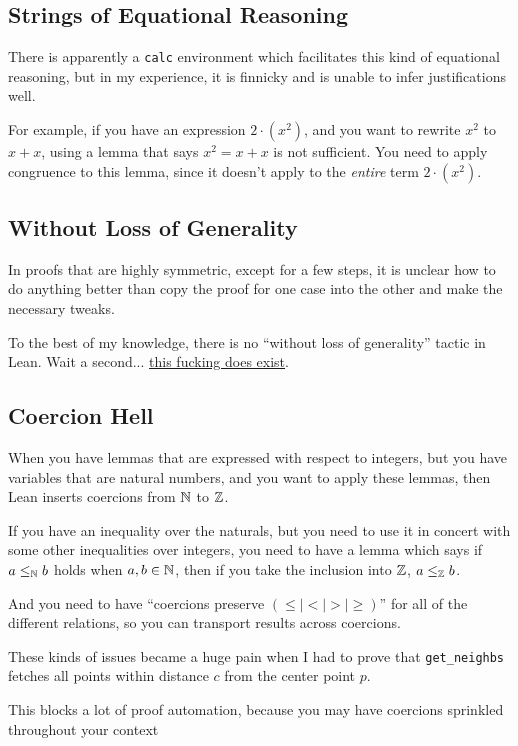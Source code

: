 \documentclass{article}
\begin{document}
\subsection{Strings of Equational Reasoning}
There is apparently a \texttt{calc} environment which facilitates this kind of equational reasoning, but in my experience, it is finnicky and is unable to infer justifications well.

For example, if you have an expression $2 \cdot (x^2)$, and you want to rewrite $x^2$ to $x + x$, using a lemma that says $x^2 = x + x$ is not sufficient.
You need to apply congruence to this lemma, since it doesn't apply to the \textit{entire} term $2 \cdot (x^2)$.

\subsection{Without Loss of Generality}
In proofs that are highly symmetric, except for a few steps, it is unclear how to do anything better than copy the proof for one case into the other and make the necessary tweaks.

To the best of my knowledge, there is no ``without loss of generality'' tactic in Lean.
Wait a second... \href{https://leanprover-community.github.io/mathlib_docs/tactic/wlog.html}{this fucking does exist}.

\subsection{Coercion Hell}
When you have lemmas that are expressed with respect to integers, but you have variables that are natural numbers, and you want to apply these lemmas, then Lean inserts coercions from $\mathbb{N}$ to $\mathbb{Z}$.

If you have an inequality over the naturals, but you need to use it in concert with some other inequalities over integers, you need to have a lemma which says if $a \leq_{\mathbb{N}} b$ holds when $a,b \in \mathbb{N}$, then if you take the inclusion into $\mathbb{Z}$, $a \leq_{\mathbb{Z}} b$.

And you need to have ``coercions preserve $(\leq \mid < \mid > \mid \geq)$'' for all of the different relations, so you can transport results across coercions.

These kinds of issues became a huge pain when I had to prove that \texttt{get\_neighbs} fetches all points within distance $c$ from the center point $p$.

This blocks a lot of proof automation, because you may have coercions sprinkled throughout your context
\end{document}
